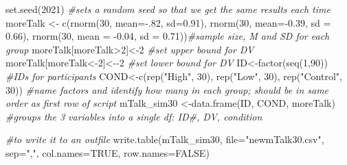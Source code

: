 \documentclass[
  english,
]{book}
\newenvironment{Shaded}{\begin{snugshade}}{\end{snugshade}}
\newcommand{\AttributeTok}[1]{\textcolor[rgb]{0.77,0.63,0.00}{#1}}
\newcommand{\CommentTok}[1]{\textcolor[rgb]{0.56,0.35,0.01}{\textit{#1}}}
\newcommand{\ConstantTok}[1]{\textcolor[rgb]{0.00,0.00,0.00}{#1}}
\newcommand{\DecValTok}[1]{\textcolor[rgb]{0.00,0.00,0.81}{#1}}
\newcommand{\FloatTok}[1]{\textcolor[rgb]{0.00,0.00,0.81}{#1}}
\newcommand{\FunctionTok}[1]{\textcolor[rgb]{0.00,0.00,0.00}{#1}}
\newcommand{\NormalTok}[1]{#1}
\newcommand{\OtherTok}[1]{\textcolor[rgb]{0.56,0.35,0.01}{#1}}
\newcommand{\SpecialCharTok}[1]{\textcolor[rgb]{0.00,0.00,0.00}{#1}}
\newcommand{\StringTok}[1]{\textcolor[rgb]{0.31,0.60,0.02}{#1}}
\begin{document}
\begin{Shaded}
\begin{Highlighting}[]
\FunctionTok{set.seed}\NormalTok{(}\DecValTok{2021}\NormalTok{) }\CommentTok{\#sets a random seed so that we get the same results each time}
\NormalTok{moreTalk }\OtherTok{\textless{}{-}} \FunctionTok{c}\NormalTok{(}\FunctionTok{rnorm}\NormalTok{(}\DecValTok{30}\NormalTok{, }\AttributeTok{mean=}\SpecialCharTok{{-}}\NormalTok{.}\DecValTok{82}\NormalTok{, }\AttributeTok{sd=}\FloatTok{0.91}\NormalTok{), }\FunctionTok{rnorm}\NormalTok{(}\DecValTok{30}\NormalTok{, }\AttributeTok{mean=}\SpecialCharTok{{-}}\FloatTok{0.39}\NormalTok{, }\AttributeTok{sd =} \FloatTok{0.66}\NormalTok{), }\FunctionTok{rnorm}\NormalTok{(}\DecValTok{30}\NormalTok{, }\AttributeTok{mean =} \SpecialCharTok{{-}}\FloatTok{0.04}\NormalTok{, }\AttributeTok{sd =} \FloatTok{0.71}\NormalTok{))}\CommentTok{\#sample size, M and SD for each group}
\NormalTok{moreTalk[moreTalk}\SpecialCharTok{\textgreater{}}\DecValTok{2}\NormalTok{]}\OtherTok{\textless{}{-}}\DecValTok{2} \CommentTok{\#set upper bound for DV}
\NormalTok{moreTalk[moreTalk}\OtherTok{\textless{}{-}}\DecValTok{2}\NormalTok{]}\OtherTok{\textless{}{-}}\SpecialCharTok{{-}}\DecValTok{2} \CommentTok{\#set lower bound for DV}
\NormalTok{ID}\OtherTok{\textless{}{-}}\FunctionTok{factor}\NormalTok{(}\FunctionTok{seq}\NormalTok{(}\DecValTok{1}\NormalTok{,}\DecValTok{90}\NormalTok{)) }\CommentTok{\#IDs for participants}
\NormalTok{COND}\OtherTok{\textless{}{-}}\FunctionTok{c}\NormalTok{(}\FunctionTok{rep}\NormalTok{(}\StringTok{"High"}\NormalTok{, }\DecValTok{30}\NormalTok{), }\FunctionTok{rep}\NormalTok{(}\StringTok{"Low"}\NormalTok{, }\DecValTok{30}\NormalTok{), }\FunctionTok{rep}\NormalTok{(}\StringTok{"Control"}\NormalTok{, }\DecValTok{30}\NormalTok{)) }\CommentTok{\#name factors and identify how many in each group; should be in same order as first row of script}
\NormalTok{mTalk\_sim30 }\OtherTok{\textless{}{-}}\FunctionTok{data.frame}\NormalTok{(ID, COND, moreTalk) }\CommentTok{\#groups the 3 variables into a single df:  ID\#, DV, condition}

\CommentTok{\#to write it to an outfile}
\FunctionTok{write.table}\NormalTok{(mTalk\_sim30, }\AttributeTok{file=}\StringTok{"newmTalk30.csv"}\NormalTok{, }\AttributeTok{sep=}\StringTok{","}\NormalTok{, }\AttributeTok{col.names=}\ConstantTok{TRUE}\NormalTok{, }\AttributeTok{row.names=}\ConstantTok{FALSE}\NormalTok{)}
\end{Highlighting}
\end{Shaded}
\end{document}
